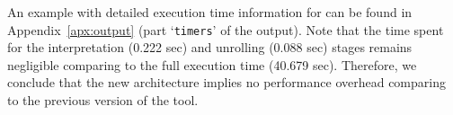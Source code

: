 An example with detailed execution time information for \porthos[2] can be found in Appendix~\ref{apx:output} (part `\texttt{timers}' of the output).
Note that the time spent for the interpretation (0.222 sec) and unrolling (0.088 sec) stages remains negligible comparing to the full execution time (40.679 sec).
Therefore, we conclude that the new architecture implies no performance overhead comparing to the previous version of the tool.

%





